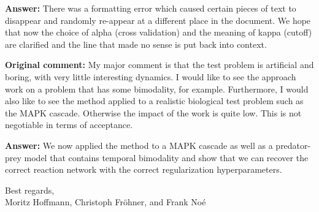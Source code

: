 \documentclass[11pt,english]{scrartcl}
\begin{document}
\textbf{Answer:}
There was a formatting error which caused certain pieces of
text to disappear and randomly re-appear at a different place in the
document. We hope that now the choice of alpha (cross validation) and
the meaning of kappa (cutoff) are clarified and the line that made no
sense is put back into context.\newline

\textbf{Original comment:}
{My major comment is that the test problem is artificial and boring, with very little interesting dynamics. I would like to see the approach work on a problem that has some bimodality, for example. Furthermore, I would also like to see the method applied to a realistic biological test problem such as the MAPK cascade. Otherwise the impact of the work is quite low. This is not negotiable in terms of acceptance.}\newline

\textbf{Answer:}
We now applied the method to a MAPK cascade as well as a predator-prey model that contains
temporal bimodality and show that we can recover the correct reaction
network with the correct regularization hyperparameters.\newline

Best regards,\\

Moritz Hoffmann, Christoph Fröhner, and Frank Noé
\end{document}
